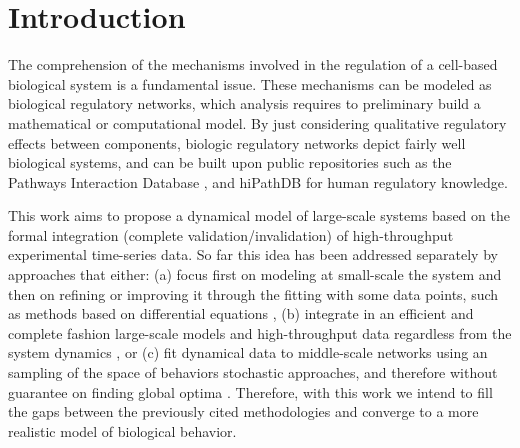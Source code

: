 
\section{Introduction}






The comprehension of the mechanisms involved in the regulation of a cell-based biological system is a fundamental 
issue. These mechanisms can be modeled as biological regulatory networks, which analysis requires to preliminary build a 
mathematical or computational model. 
By just considering qualitative regulatory effects between components, biologic regulatory networks
depict fairly well biological systems, and can be built upon public repositories such as the Pathways 
Interaction Database \cite{schaefer2009pid}, and 
hiPathDB \cite{yu2012hipathdb} for human regulatory knowledge.


This work aims to propose a dynamical model of large-scale systems based on the formal integration 
(complete validation/invalidation) of high-throughput experimental time-series data.  So far this 
idea has been addressed separately by approaches that either: (a) focus first on
modeling at small-scale the system and then on refining or improving it through the fitting with
some data points, such as methods based on differential equations \cite{tyson2003sniffers,batt2005validation,mobashir2012simulated}, 
(b) integrate in an efficient and complete fashion large-scale models
and high-throughput data regardless from the system dynamics \cite{guziolowski2013exhaustively,mitsos2009identifying}, or 
(c) fit dynamical data to middle-scale networks using an sampling of the space of behaviors stochastic approaches, and
therefore without guarantee on finding global optima \cite{macnamara2012state}. Therefore, with this
work we intend to fill the gaps between the previously cited methodologies and converge to a more
realistic model of biological behavior.


